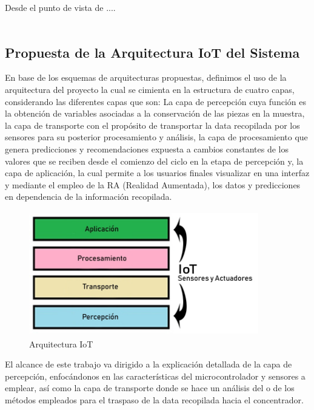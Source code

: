     \vspace{1cm}
    Desde el punto de vista de ....\\\\

    \subsection{Propuesta de la Arquitectura IoT del Sistema}

    En base de los esquemas de arquitecturas propuestas, definimos el uso de la arquitectura del proyecto la cual se cimienta en la estructura de cuatro capas, considerando las diferentes capas que son: La capa de percepción cuya función es la obtención de variables asociadas a la conservación de las piezas en la muestra, la capa de transporte con el propósito de transportar la data recopilada por los sensores para su posterior procesamiento y análisis, la capa de procesamiento que genera predicciones y recomendaciones expuesta a cambios constantes de los valores que se reciben desde el comienzo del ciclo en la etapa de percepción y, la capa de aplicación, la cual permite a los usuarios finales visualizar en una interfaz y mediante el empleo de la RA (Realidad Aumentada), los datos y predicciones en dependencia de la información recopilada.\\

    \begin{figure}[h]
        \hspace{4.6cm}
        \includegraphics[width=10cm, height=5.4cm]{imagenes/myArquitecture2.jpg}
        \caption{Arquitectura IoT}
        \label{imag:arquitectura_iot}
    \end{figure}

    El alcance de este trabajo va dirigido a la explicación detallada de la capa de percepción, enfocándonos en las características del microcontrolador y sensores a emplear, así como la capa de transporte donde se hace un análisis del o de los métodos empleados para el traspaso de la data recopilada hacia el concentrador.\\\\

